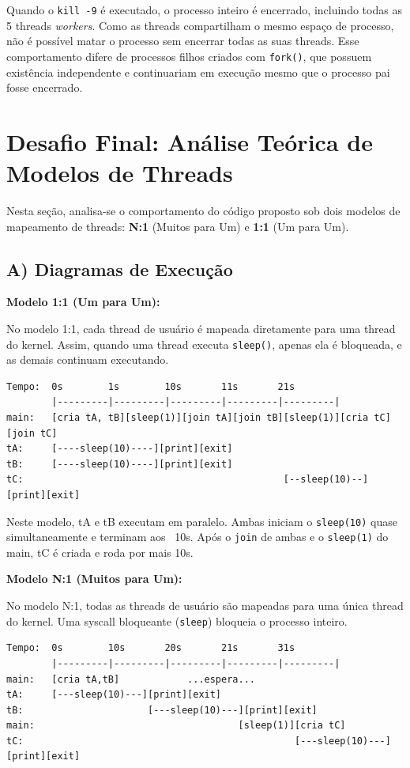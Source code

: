 \documentclass[11pt]{ifscarticle}
\begin{document}
    Quando o \texttt{kill -9} é executado, o processo inteiro é encerrado, incluindo todas as 5 threads \textit{workers}. Como as threads compartilham o mesmo espaço de processo, não é possível matar o processo sem encerrar todas as suas threads. Esse comportamento difere de processos filhos criados com \texttt{fork()}, que possuem existência independente e continuariam em execução mesmo que o processo pai fosse encerrado.


\section{Desafio Final: Análise Teórica de Modelos de Threads}

    Nesta seção, analisa-se o comportamento do código proposto sob dois modelos de mapeamento de threads: \textbf{N:1} (Muitos para Um) e \textbf{1:1} (Um para Um).

    \subsection{A) Diagramas de Execução}

    \textbf{Modelo 1:1 (Um para Um):}

    No modelo 1:1, cada thread de usuário é mapeada diretamente para uma thread do kernel. Assim, quando uma thread executa \texttt{sleep()}, apenas ela é bloqueada, e as demais continuam executando.

    \begin{verbatim}
Tempo:  0s        1s        10s       11s       21s
        |---------|---------|---------|---------|---------|
main:   [cria tA, tB][sleep(1)][join tA][join tB][sleep(1)][cria tC][join tC]
tA:     [----sleep(10)----][print][exit]
tB:     [----sleep(10)----][print][exit]
tC:                                              [--sleep(10)--][print][exit]
    \end{verbatim}

    Neste modelo, tA e tB executam em paralelo. Ambas iniciam o \texttt{sleep(10)} quase simultaneamente e terminam aos ~10s. Após o \texttt{join} de ambas e o \texttt{sleep(1)} do main, tC é criada e roda por mais 10s.

    \textbf{Modelo N:1 (Muitos para Um):}

    No modelo N:1, todas as threads de usuário são mapeadas para uma única thread do kernel. Uma syscall bloqueante (\texttt{sleep}) bloqueia o processo inteiro.

    \begin{verbatim}
Tempo:  0s        10s       20s       21s       31s
        |---------|---------|---------|---------|---------|
main:   [cria tA,tB]            ...espera...
tA:     [---sleep(10)---][print][exit]
tB:                      [---sleep(10)---][print][exit]
main:                                    [sleep(1)][cria tC]
tC:                                                [---sleep(10)---][print][exit]
    \end{verbatim}
\end{document}

